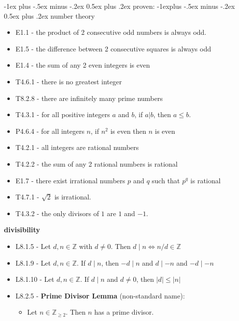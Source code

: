 \documentclass[10pt, landscape]{article}
\makeatletter
\renewcommand{\section}{\@startsection{section}{1}{0mm}%
                                {-1ex plus -.5ex minus -.2ex}%
                                {0.5ex plus .2ex}%
                                {\normalfont\large\bfseries}}
\renewcommand{\subsection}{\@startsection{subsection}{2}{0mm}%
                                {-1explus -.5ex minus -.2ex}%
                                {0.5ex plus .2ex}%
                                {\normalfont\normalsize\bfseries}}
\renewcommand{\bf}[1]{\textbf{#1}}
\let\Iff\Leftrightarrow
\makeatother
\begin{document}
\begin{multicols}{3}
    \section{proven:}
    \subsection{number theory}
    \begin{itemize}
        \item E1.1 - the product of 2 consecutive odd numbers is always odd.
        \item E1.5 - the difference between 2 consecutive squares is always odd
        \item E1.4 - the sum of any 2 even integers is even
        \item T4.6.1 - there is no greatest integer
        \item T8.2.8 - there are infinitely many prime numbers
        \item T4.3.1 - for all positive integers $a$ and $b$, if $a \vert b$, then $a \leq b$.
        \item P4.6.4 - for all integers $n$, if $n^2$ is even then $n$ is even
        \item T4.2.1 - all integers are rational numbers
        \item T4.2.2 - the sum of any 2 rational numbers is rational
        \item E1.7 - there exist irrational numbers $p$ and $q$ such that $p^q$ is rational
        \item T4.7.1 - $\sqrt{2}$ is irrational.
        \item T4.3.2 - the only divisors of $1$ are $1$ and $-1$.
    \end{itemize}
    \textbf{divisibility}
    \begin{itemize}
        \item L8.1.5 - Let $d, n \in \mathbb{Z}$ with $d \neq 0$. Then $d \mid n \Iff n/d \in \mathbb{Z}$ 
        \item L8.1.9 - Let $d, n \in \mathbb{Z}$. If $d \mid n$, then $-d \mid n$ and $d \mid -n$ and $-d \mid -n$ 
        \item L8.1.10 - Let $d, n \in \mathbb{Z}$. If $d \mid n$ and $d \neq 0$, then $\vert d \vert \leq \vert n \vert$ 
        \item L8.2.5 - \bf{Prime Divisor Lemma} (non-standard name):
        \begin{itemize}
            \item Let $n \in \mathbb{Z}_{\geq 2}$. Then $n$ has a prime divisor.

\end{itemize}
\end{itemize}
\end{multicols}
\end{document}
